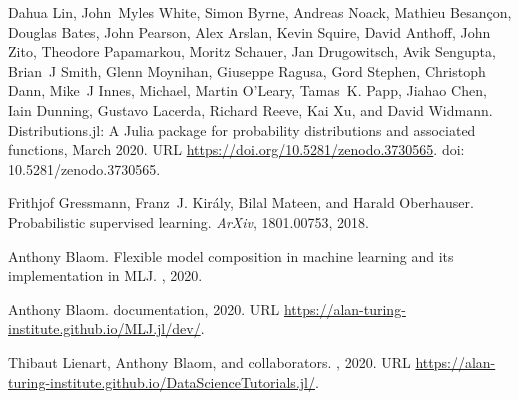 \documentclass{article}
\begin{document}
\begin{thebibliography}{18}
Dahua Lin, John~Myles White, Simon Byrne, Andreas Noack, Mathieu Besançon,
  Douglas Bates, John Pearson, Alex Arslan, Kevin Squire, David Anthoff, John
  Zito, Theodore Papamarkou, Moritz Schauer, Jan Drugowitsch, Avik Sengupta,
  Brian~J Smith, Glenn Moynihan, Giuseppe Ragusa, Gord Stephen, Christoph Dann,
  Mike~J Innes, Michael, Martin O'Leary, Tamas~K. Papp, Jiahao Chen, Iain
  Dunning, Gustavo Lacerda, Richard Reeve, Kai Xu, and David Widmann.
\newblock Distributions.jl: {A} {J}ulia package for probability distributions
  and associated functions, March 2020.
\newblock URL \url{https://doi.org/10.5281/zenodo.3730565}.
\newblock doi: {10.5281/zenodo.3730565}.

Frithjof Gressmann, Franz~J. Király, Bilal Mateen, and Harald Oberhauser.
\newblock Probabilistic supervised learning.
\newblock \emph{ArXiv}, 1801.00753, 2018.

Anthony Blaom.
\newblock Flexible model composition in machine learning and its implementation
  in {MLJ}.
\newblock \emph{}, 2020{}.

Anthony Blaom.
 documentation, 2020{}.
\newblock URL \url{https://alan-turing-institute.github.io/MLJ.jl/dev/}.

Thibaut Lienart, Anthony Blaom, and collaborators.
, 2020.
\newblock URL
  \url{https://alan-turing-institute.github.io/DataScienceTutorials.jl/}.

\end{thebibliography}
\end{document}
